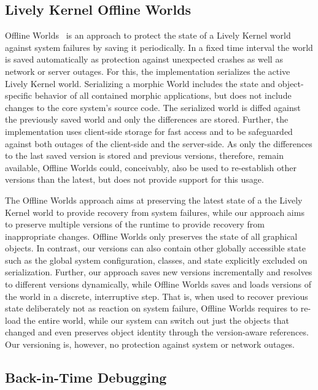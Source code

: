 \subsection{Lively Kernel Offline Worlds}

Offline Worlds~\cite{Czuchra2012OfW} is an approach to protect the state of a Lively Kernel world against system failures by saving it periodically.
In a fixed time interval the world is saved automatically as protection against unexpected crashes as well as network or server outages.
For this, the implementation serializes the active Lively Kernel world.
Serializing a morphic World includes the state and object-specific behavior of all contained morphic applications, but does not include changes to the core system's source code.
The serialized world is diffed against the previously saved world and only the differences are stored.
Further, the implementation uses client-side storage for fast access and to be safeguarded against both outages of the client-side and the server-side.
As only the differences to the last saved version is stored and previous versions, therefore, remain available, Offline Worlds could, conceivably, also be used to re-establish other versions than the latest, but does not provide support for this usage.

The Offline Worlds approach aims at preserving the latest state of a the Lively Kernel world to provide recovery from system failures, while our approach aims to preserve multiple versions of the runtime to provide recovery from inappropriate changes.
Offline Worlds only preserves the state of all graphical objects.
In contrast, our versions can also contain other globally accessible state such as the global system configuration, classes, and state explicitly excluded on serialization.
Further, our approach saves new versions incrementally and resolves to different versions dynamically, while Offline Worlds saves and loads versions of the world in a discrete, interruptive step.
That is, when used to recover previous state deliberately not as reaction on system failure, Offline Worlds requires to re-load the entire world, while our system can switch out just the objects that changed and even preserves object identity through the version-aware references.
Our versioning is, however, no protection against system or network outages.


\subsection{Back-in-Time Debugging}


